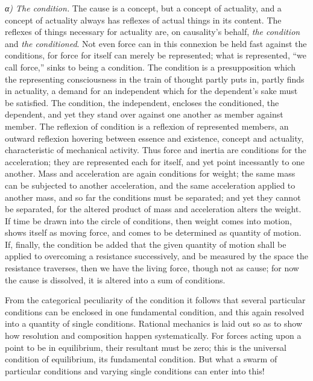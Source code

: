 \documentclass[12pt,a4paper]{book}
\newcommand{\subrunin}[1]{\emph{#1}\hspace{0.4em}}
\begin{document}
\subrunin{α) The condition.} The cause is a concept, but a concept of actuality, and a
concept of actuality always has reflexes of actual things in its content. The reflexes of
things necessary for actuality are, on causality's behalf, \emph{the condition} and \emph{the
conditioned}. Not even force can in this connexion be held fast against the conditions, for
force for itself can merely be represented; what is represented, ``we call force,'' sinks to
being a condition. The condition is a presupposition which the representing consciousness
in the train of thought partly puts in, partly finds in actuality, a demand for an
independent which for the dependent's sake must be satisfied. The condition, the independent,
encloses the conditioned, the dependent, and yet they stand over against one another as
member against member. The reflexion of condition is a reflexion of represented members, an
outward reflexion hovering between essence and existence, concept and actuality,
characteristic of mechanical activity. Thus force and inertia are conditions for the
acceleration; they are represented each for itself, and yet point incessantly to one another.
Mass and acceleration are again conditions for weight; the same mass can be subjected to
another acceleration, and the same acceleration applied to another mass, and so far the
conditions must be separated; and yet they cannot be separated, for the altered product of
mass and acceleration alters the weight. If time be drawn into the circle of conditions, then
weight comes into motion, shows itself as moving force, and comes to be determined as
quantity of motion. If, finally, the condition be added that the given quantity of motion
shall be applied to overcoming a resistance successively, and be measured by the space the
resistance traverses, then we have the living force, though not as cause; for now the cause is
dissolved, it is altered into a sum of conditions.

From the categorical peculiarity of the condition it follows that several particular
conditions can be enclosed in one fundamental condition, and this again resolved into a
quantity of single conditions. Rational mechanics is laid out so as to show how resolution and
composition happen systematically. For forces acting upon a point to be in equilibrium, their
resultant must be zero; this is the universal condition of equilibrium, its fundamental
condition. But what a swarm of particular conditions and varying single conditions can enter
into this!
\end{document}
